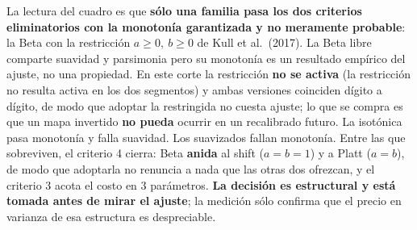 \documentclass[12pt, a4paper]{article}
\begin{document}
\noindent La lectura del cuadro es que \textbf{sólo una familia pasa los dos criterios
eliminatorios con la monotonía garantizada y no meramente probable}: la Beta con la restricción
$a\ge0,\ b\ge0$ de Kull et al.\ (2017). La Beta libre comparte suavidad y parsimonia pero su
monotonía es un resultado empírico del ajuste, no una propiedad. En este corte la restricción
\textbf{no se activa} (la restricción no resulta activa en los dos
segmentos) y ambas versiones coinciden dígito a dígito, de modo que adoptar la restringida no
cuesta ajuste; lo que se compra es que un mapa invertido \textbf{no pueda} ocurrir en un
recalibrado futuro. La isotónica pasa monotonía y falla suavidad. Los suavizados
fallan monotonía. Entre las que sobreviven, el criterio 4 cierra: Beta \textbf{anida} al shift
($a=b=1$) y a Platt ($a=b$), de modo que adoptarla no renuncia a nada que las otras dos ofrezcan,
y el criterio 3 acota el costo en 3 parámetros. \textbf{La decisión es estructural y está tomada
antes de mirar el ajuste}; la medición sólo confirma que el precio en varianza de esa estructura
es despreciable.
\end{document}
